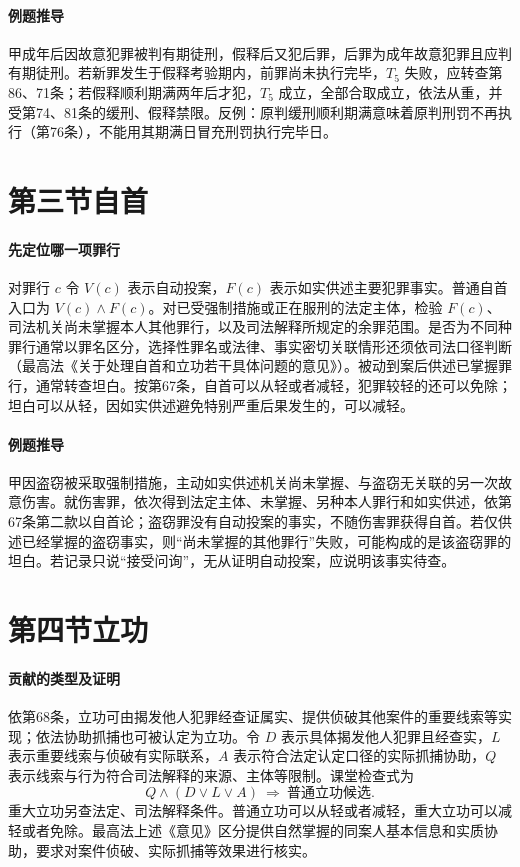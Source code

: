 \paragraph{例题推导}
甲成年后因故意犯罪被判有期徒刑，假释后又犯后罪，后罪为成年故意犯罪且应判有期徒刑。若新罪发生于假释考验期内，前罪尚未执行完毕，\(T_5\) 失败，应转查第86、71条；若假释顺利期满两年后才犯，\(T_5\) 成立，全部合取成立，依法从重，并受第74、81条的缓刑、假释禁限。反例：原判缓刑顺利期满意味着原判刑罚不再执行（第76条），不能用其期满日冒充刑罚执行完毕日。

\section{第三节\quad 自首}
\paragraph{先定位哪一项罪行}
对罪行 \(c\) 令 \(V(c)\) 表示自动投案，\(F(c)\) 表示如实供述主要犯罪事实。普通自首入口为 \(V(c)\land F(c)\)。对已受强制措施或正在服刑的法定主体，检验 \(F(c)\)、司法机关尚未掌握本人其他罪行，以及司法解释所规定的余罪范围。是否为不同种罪行通常以罪名区分，选择性罪名或法律、事实密切关联情形还须依司法口径判断（最高法《关于处理自首和立功若干具体问题的意见》）。被动到案后供述已掌握罪行，通常转查坦白。按第67条，自首可以从轻或者减轻，犯罪较轻的还可以免除；坦白可以从轻，因如实供述避免特别严重后果发生的，可以减轻。

\paragraph{例题推导}
甲因盗窃被采取强制措施，主动如实供述机关尚未掌握、与盗窃无关联的另一次故意伤害。就伤害罪，依次得到法定主体、未掌握、另种本人罪行和如实供述，依第67条第二款以自首论；盗窃罪没有自动投案的事实，不随伤害罪获得自首。若仅供述已经掌握的盗窃事实，则“尚未掌握的其他罪行”失败，可能构成的是该盗窃罪的坦白。若记录只说“接受问询”，无从证明自动投案，应说明该事实待查。

\section{第四节\quad 立功}
\paragraph{贡献的类型及证明}
依第68条，立功可由揭发他人犯罪经查证属实、提供侦破其他案件的重要线索等实现；依法协助抓捕也可被认定为立功。令 \(D\) 表示具体揭发他人犯罪且经查实，\(L\) 表示重要线索与侦破有实际联系，\(A\) 表示符合法定认定口径的实际抓捕协助，\(Q\) 表示线索与行为符合司法解释的来源、主体等限制。课堂检查式为
\[
 Q\land(D\lor L\lor A)\ \Longrightarrow\ \text{普通立功候选}.
\]
重大立功另查法定、司法解释条件。普通立功可以从轻或者减轻，重大立功可以减轻或者免除。最高法上述《意见》区分提供自然掌握的同案人基本信息和实质协助，要求对案件侦破、实际抓捕等效果进行核实。

